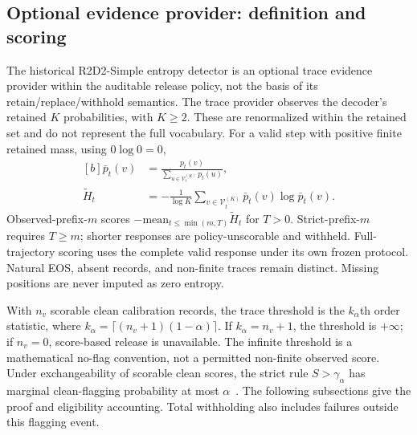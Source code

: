 \documentclass[journal,onecolumn]{IEEEtran}
\begin{document}
\subsection{Optional evidence provider: definition and scoring}
The historical R2D2-Simple entropy detector is an optional trace evidence provider within the auditable release policy, not the basis of its retain/replace/withhold semantics. The trace provider observes the decoder's retained $K$ probabilities, with $K\ge2$. These are renormalized within the retained set and do not represent the full vocabulary. For a valid step with positive finite retained mass, using $0\log0=0$,
\begin{equation}
\begin{aligned}[b]
\bar p_t(v)&=\frac{p_t(v)}{\sum_{u\in\mathcal V_t^{(K)}}p_t(u)},\\
\widetilde H_t&=-\frac{1}{\log K}\sum_{v\in\mathcal V_t^{(K)}}\bar p_t(v)\log\bar p_t(v).
\end{aligned}
\label{eq:retained-entropy}
\end{equation}
Observed-prefix-$m$ scores $-\mathrm{mean}_{t\le\min(m,T)}\widetilde H_t$ for $T>0$. Strict-prefix-$m$ requires $T\ge m$; shorter responses are policy-unscorable and withheld. Full-trajectory scoring uses the complete valid response under its own frozen protocol. Natural EOS, absent records, and non-finite traces remain distinct. Missing positions are never imputed as zero entropy.

With $n_v$ scorable clean calibration records, the trace threshold is the $k_\alpha$th order statistic, where $k_\alpha=\lceil(n_v+1)(1-\alpha)\rceil$. If $k_\alpha=n_v+1$, the threshold is $+\infty$; if $n_v=0$, score-based release is unavailable. The infinite threshold is a mathematical no-flag convention, not a permitted non-finite observed score. Under exchangeability of scorable clean scores, the strict rule $S>\gamma_\alpha$ has marginal clean-flagging probability at most $\alpha$~\cite{bates2023testing}. The following subsections give the proof and eligibility accounting. Total withholding also includes failures outside this flagging event.
\end{document}
